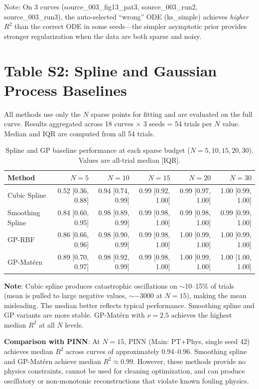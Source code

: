 \documentclass{article}
\begin{document}
Note: On 3 curves (source\_003\_fig13\_pat3, source\_003\_run2, source\_003\_run3), the auto-selected ``wrong'' ODE (ks\_simple) achieves \textit{higher} $R^2$ than the correct ODE in some seeds---the simpler asymptotic prior provides stronger regularization when the data are both sparse and noisy.

\section*{Table S2: Spline and Gaussian Process Baselines}

All methods use only the $N$ sparse points for fitting and are evaluated on the full curve.
Results aggregated across 18 curves $\times$ 3 seeds = 54 trials per $N$ value.
Median and IQR are computed from all 54 trials.

\begin{table}[htbp]
\centering
\caption{Spline and GP baseline performance at each sparse budget ($N=5,10,15,20,30$). Values are all-trial median [IQR].}
\label{tab:s2}
\begin{tabular}{@{}lrrrrr@{}}
\toprule
Method & $N=5$ & $N=10$ & $N=15$ & $N=20$ & $N=30$ \\
\midrule
Cubic Spline & 0.52 [0.36, 0.88] & 0.94 [0.74, 0.99] & 0.99 [0.92, 1.00] & 0.99 [0.97, 1.00] & 1.00 [0.99, 1.00] \\
Smoothing Spline & 0.84 [0.60, 0.95] & 0.98 [0.89, 0.99] & 0.99 [0.98, 1.00] & 0.99 [0.98, 1.00] & 0.99 [0.99, 1.00] \\
GP-RBF & 0.86 [0.66, 0.96] & 0.98 [0.90, 0.99] & 0.99 [0.98, 1.00] & 1.00 [0.99, 1.00] & 1.00 [0.99, 1.00] \\
GP-Mat\'{e}rn & 0.89 [0.70, 0.97] & 0.98 [0.92, 0.99] & 0.99 [0.98, 1.00] & 1.00 [0.99, 1.00] & 1.00 [1.00, 1.00] \\
\bottomrule
\end{tabular}
\end{table}

\textbf{Note}: Cubic spline produces catastrophic oscillations on $\sim$10--15\% of trials (mean is pulled to large negative values, $\sim -3000$ at $N=15$), making the mean misleading. The median better reflects typical performance. Smoothing spline and GP variants are more stable. GP-Mat\'{e}rn with $\nu=2.5$ achieves the highest median $R^2$ at all $N$ levels.

\textbf{Comparison with PINN}: At $N=15$, PINN (Main: PT+Phys, single seed 42) achieves median $R^2$ across curves of approximately 0.94--0.96. Smoothing spline and GP-Mat\'{e}rn achieve median $R^2 \approx 0.99$. However, these methods provide no physics constraints, cannot be used for cleaning optimization, and can produce oscillatory or non-monotonic reconstructions that violate known fouling physics.
\end{document}

